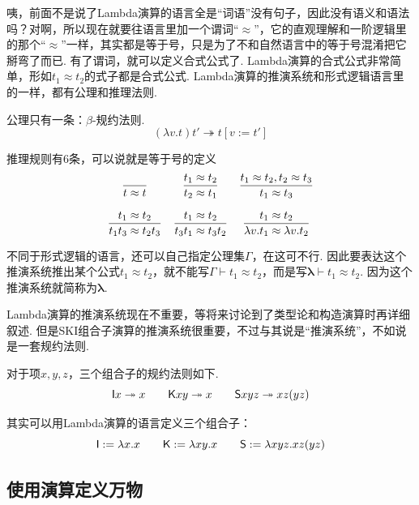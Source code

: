 咦，前面不是说了Lambda演算的语言全是“词语”没有句子，因此没有语义和语法吗？对啊，所以现在就要往语言里加一个谓词“\(\approx\)”，它的直观理解和一阶逻辑里的那个“\(\approx\)”一样，其实都是等于号，只是为了不和自然语言中的等于号混淆把它掰弯了而已. 有了谓词，就可以定义合式公式了. Lambda演算的合式公式非常简单，形如\(t_1\approx t_2\)的式子都是合式公式. Lambda演算的推演系统和形式逻辑语言里的一样，都有公理和推理法则. 

公理只有一条：\(\beta\)-规约法则.
\[(\lambda v.t)t' \twoheadrightarrow t[v:=t']\]

推理规则有6条，可以说就是等于号的定义
\[
    \begin{array}{*3{>{\displaystyle}c}}
        {\over t  \approx  t} & {{t_1 \approx t_2} \over {t_2 \approx t_1}} & {{t_1 \approx t_2,t_2 \approx t_3} \over {t_1 \approx t_3}} \\
        \\
        {{t_1 \approx t_2} \over {t_1t_3 \approx t_2t_3}} & {{t_1 \approx t_2} \over {t_3t_1 \approx t_3t_2}} & {{t_1 \approx t_2} \over {\lambda v.t_1 \approx \lambda v.t_2}}
    \end{array}
\]

不同于形式逻辑的语言，还可以自己指定公理集\(\Gamma\)，在这可不行. 因此要表达这个推演系统推出某个公式\(t_1 \approx t_2\)，就不能写\(\Gamma \vdash t_1 \approx t_2\)，而是写\(\boldsymbol{\lambda} \vdash t_1 \approx t_2\). 因为这个推演系统就简称为\(\boldsymbol{\lambda}\).

Lambda演算的推演系统现在不重要，等将来讨论到了类型论和构造演算时再详细叙述. 但是SKI组合子演算的推演系统很重要，不过与其说是“推演系统”，不如说是一套规约法则. 

对于项\(x,y,z\)，三个组合子的规约法则如下.
\[{\sf I}x \twoheadrightarrow x \qquad {\sf K}xy \twoheadrightarrow x \qquad {\sf S}xyz \twoheadrightarrow xz(yz)\]

其实可以用Lambda演算的语言定义三个组合子：
\[{\sf I} := \lambda x.x \qquad {\sf K} := \lambda xy.x \qquad {\sf S} := \lambda xyz. xz(yz)\]

\subsection{使用演算定义万物}

